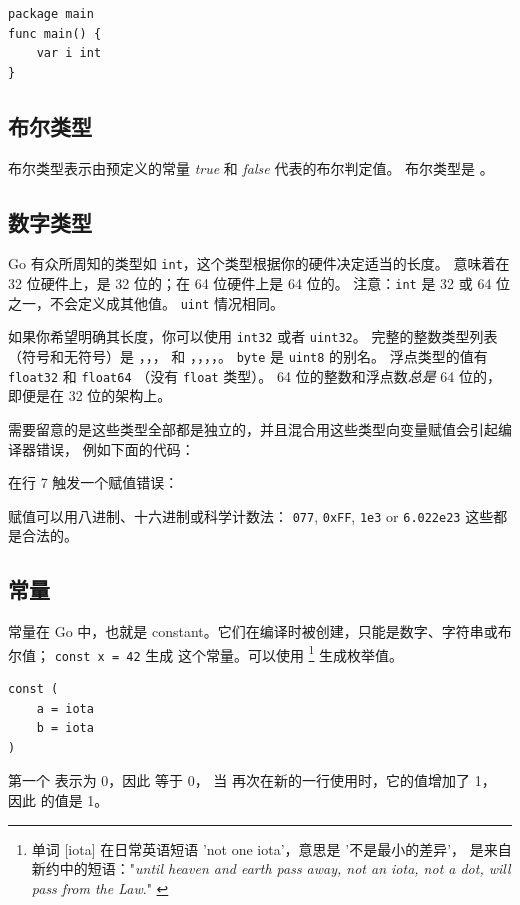 \begin{lstlisting}
package main
func main() { 
    var i int
}
\end{lstlisting}

\subsection{布尔类型}
布尔类型表示由预定义的常量 \emph{true} 和 \emph{false} 代表的布尔判定值。
布尔类型是 。

\subsection{数字类型}
Go 有众所周知的类型如 \lstinline{int}，这个类型根据你的硬件决定适当的长度。
意味着在 32 位硬件上，是 32 位的；在 64 位硬件上是 64 位的。
注意：\lstinline{int} 是 32 或 64 位之一，不会定义成其他值。
\lstinline{uint} 情况相同。

如果你希望明确其长度，你可以使用 \lstinline{int32} 或者 \lstinline{uint32}。
完整的整数类型列表（符号和无符号）是 
，，， 和
，，，，。
\lstinline{byte} 是 \lstinline{uint8} 的别名。
浮点类型的值有 \lstinline{float32} 和 \lstinline{float64}
（没有 \lstinline{float} 类型）。 
64 位的整数和浮点数\emph{总是} 64 位的，即便是在 32 位的架构上。

需要留意的是这些类型全部都是独立的，并且混合用这些类型向变量赋值会引起编译器错误，
例如下面的代码：

在行 7 触发一个赋值错误：

\noindent{}

赋值可以用八进制、十六进制或科学计数法：
\lstinline{077}, \lstinline{0xFF}, \lstinline{1e3} or
\mbox{\lstinline{6.022e23}} 这些都是合法的。

\subsection{常量}
\label{sec:constants}
常量在 Go 中，也就是 constant。它们在编译时被创建，只能是数字、字符串或布尔值；
\lstinline{const x = 42} 生成  这个常量。可以使用 
\footnote{单词 [iota] 在日常英语短语 'not one iota'，意思是 '不是最小的差异'，
是来自新约中的短语："\emph{until heaven and earth pass away, not an
iota, not a dot, will pass from the Law}." \cite{iota}}
生成枚举值。
\begin{lstlisting}
const (
	a = iota
	b = iota 
)
\end{lstlisting}
第一个  表示为 0，因此  等于 0，
当  再次在新的一行使用时，它的值增加了 1，
因此  的值是 1。

